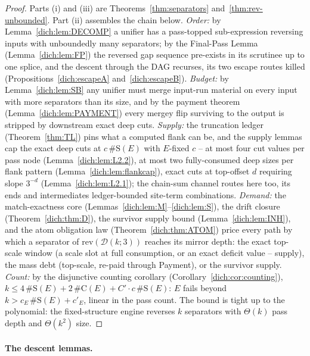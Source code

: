 \documentclass[runningheads,envcountsect]{llncs}
\begin{document}
\begin{proof}
    Parts (i) and (iii) are Theorems~\ref{thm:separators} and~\ref{thm:rev-unbounded}. Part (ii) assembles the chain below. \emph{Order:} by Lemma~\ref{dich:lem:DECOMP} a unifier has a pass-topped sub-expression reversing inputs with unboundedly many separators; by the Final-Pass Lemma (Lemma~\ref{dich:lem:FP}) the reversed gap sequence pre-exists in its scrutinee up to one splice, and the descent through the DAG recurses, its two escape routes killed (Propositions~\ref{dich:escapeA} and~\ref{dich:escapeB}). \emph{Budget:} by Lemma~\ref{dich:lem:SB} any unifier must merge input-run material on every input with more separators than its size, and by the payment theorem (Lemma~\ref{dich:lem:PAYMENT}) every mergey flip surviving to the output is stripped by downstream exact deep cuts. \emph{Supply:} the truncation ledger (Theorem~\ref{thm:TL}) pins what a computed flank can be, and the supply lemmas cap the exact deep cuts at $c\,\#\mathrm{S}(E)$ with $E$-fixed $c$ -- at most four cut values per pass node (Lemma~\ref{dich:lem:L2.2}), at most two fully-consumed deep sizes per flank pattern (Lemma~\ref{dich:lem:flankcap}), exact cuts at top-offset $d$ requiring slope $3^{-d}$ (Lemma~\ref{dich:lem:L2.1}); the chain-sum channel routes here too, its ends and intermediates ledger-bounded site-term combinations. \emph{Demand:} the match-exactness core (Lemmas~\ref{dich:lem:M}--\ref{dich:lem:S}), the drift closure (Theorem~\ref{dich:thm:D}), the survivor supply bound (Lemma~\ref{dich:lem:INH}), and the atom obligation law (Theorem~\ref{dich:thm:ATOM}) price every path by which a separator of $\mathrm{rev}(\mathcal D(k;3))$ reaches its mirror depth: the exact top-scale window (a scale slot at full consumption, or an exact deficit value -- supply), the mass debt (top-scale, re-paid through Payment), or the survivor supply. \emph{Count:} by the disjunctive counting corollary (Corollary~\ref{dich:cor:counting}), $k \le 4\,\#\mathrm{S}(E) + 2\,\#\mathrm{C}(E) + C' \cdot c\,\#\mathrm{S}(E)$: $E$ fails beyond $k > c_{E}\,\#\mathrm{S}(E) + c'_{E}$, linear in the pass count. The bound is tight up to the polynomial: the fixed-structure engine reverses $k$ separators with $\Theta(k)$ pass depth and $\Theta(k^{2})$ size.
\end{proof}

\paragraph{The descent lemmas.}
\end{document}
